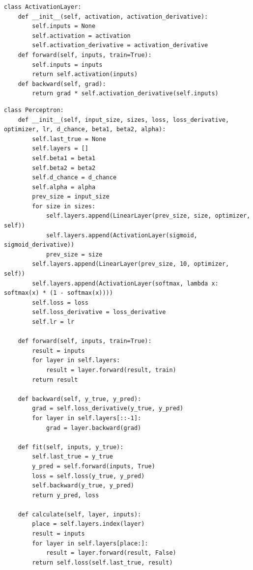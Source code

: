\documentclass[a4paper, 14pt]{extarticle}
\begin{document}
\begin{lstlisting}[language={},caption={Класс слоя активации},label={lst:code4}, breaklines=true]
class ActivationLayer:
    def __init__(self, activation, activation_derivative):
        self.inputs = None
        self.activation = activation
        self.activation_derivative = activation_derivative
    def forward(self, inputs, train=True):
        self.inputs = inputs
        return self.activation(inputs)
    def backward(self, grad):
        return grad * self.activation_derivative(self.inputs)

\end{lstlisting}




\begin{lstlisting}[language={},caption={Класс перцептрона},label={lst:code5}, breaklines=true]
class Perceptron:
    def __init__(self, input_size, sizes, loss, loss_derivative, optimizer, lr, d_chance, beta1, beta2, alpha):
        self.last_true = None
        self.layers = []
        self.beta1 = beta1
        self.beta2 = beta2
        self.d_chance = d_chance
        self.alpha = alpha
        prev_size = input_size
        for size in sizes:
            self.layers.append(LinearLayer(prev_size, size, optimizer, self))
            self.layers.append(ActivationLayer(sigmoid, sigmoid_derivative))
            prev_size = size
        self.layers.append(LinearLayer(prev_size, 10, optimizer, self))
        self.layers.append(ActivationLayer(softmax, lambda x: softmax(x) * (1 - softmax(x))))
        self.loss = loss
        self.loss_derivative = loss_derivative
        self.lr = lr

    def forward(self, inputs, train=True):
        result = inputs
        for layer in self.layers:
            result = layer.forward(result, train)
        return result

    def backward(self, y_true, y_pred):
        grad = self.loss_derivative(y_true, y_pred)
        for layer in self.layers[::-1]:
            grad = layer.backward(grad)

    def fit(self, inputs, y_true):
        self.last_true = y_true
        y_pred = self.forward(inputs, True)
        loss = self.loss(y_true, y_pred)
        self.backward(y_true, y_pred)
        return y_pred, loss

    def calculate(self, layer, inputs):
        place = self.layers.index(layer)
        result = inputs
        for layer in self.layers[place:]:
            result = layer.forward(result, False)
        return self.loss(self.last_true, result)


\end{lstlisting}
\end{document}
